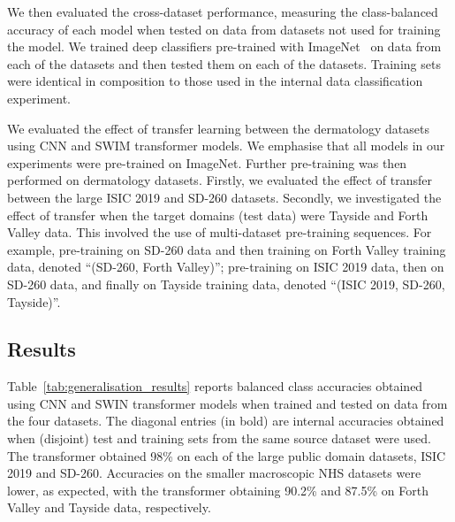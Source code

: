 We then evaluated the cross-dataset performance, measuring the class-balanced accuracy of each model when tested on data from datasets not used for training the model. We trained deep classifiers pre-trained with ImageNet~\citep{deng2009imagenet} on data from each of the datasets and then tested them on each of the datasets. Training sets were identical in composition to those used in the internal data classification experiment.

We evaluated the effect of transfer learning between the dermatology datasets using CNN and SWIM transformer models. We emphasise that all models in our experiments were pre-trained on ImageNet. Further pre-training was then performed on dermatology datasets. Firstly, we evaluated the effect of transfer between the large ISIC 2019 and SD-260 datasets. Secondly, we investigated the effect of transfer when the target domains (test data) were Tayside and Forth Valley data. This involved the use of multi-dataset pre-training sequences. For example, pre-training on SD-260 data and then training on Forth Valley training data, denoted “(SD-260, Forth Valley)”; pre-training on ISIC 2019 data, then on SD-260 data, and finally on Tayside training data, denoted “(ISIC 2019, SD-260, Tayside)”.

\subsection{Results}
\label{subsec:generalisation_results}
Table~\ref{tab:generalisation_results} reports balanced class accuracies obtained using CNN and SWIN transformer models when trained and tested on data from the four datasets. The diagonal entries (in bold) are internal accuracies obtained when (disjoint) test and training sets from the same source dataset were used. The transformer obtained 98\% on each of the large public domain datasets, ISIC 2019 and SD-260. Accuracies on the smaller macroscopic NHS datasets were lower, as expected, with the transformer obtaining 90.2\% and 87.5\% on Forth Valley and Tayside data, respectively. 

